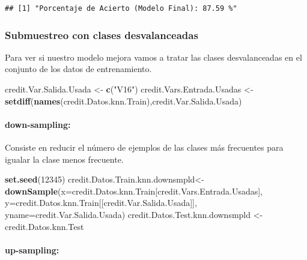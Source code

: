 \documentclass[
]{article}
\newenvironment{Shaded}{\begin{snugshade}}{\end{snugshade}}
\newcommand{\AttributeTok}[1]{\textcolor[rgb]{0.13,0.29,0.53}{#1}}
\newcommand{\DecValTok}[1]{\textcolor[rgb]{0.00,0.00,0.81}{#1}}
\newcommand{\FunctionTok}[1]{\textcolor[rgb]{0.13,0.29,0.53}{\textbf{#1}}}
\newcommand{\NormalTok}[1]{#1}
\newcommand{\OtherTok}[1]{\textcolor[rgb]{0.56,0.35,0.01}{#1}}
\newcommand{\StringTok}[1]{\textcolor[rgb]{0.31,0.60,0.02}{#1}}
\begin{document}
\begin{verbatim}
## [1] "Porcentaje de Acierto (Modelo Final): 87.59 %"
\end{verbatim}

\hypertarget{submuestreo-con-clases-desvalanceadas-1}{%
\subsubsection{Submuestreo con clases
desvalanceadas}\label{submuestreo-con-clases-desvalanceadas-1}}

Para ver si nuestro modelo mejora vamos a tratar las clases
desvalanceadas en el conjunto de los datos de entrenamiento.

\begin{Shaded}
\begin{Highlighting}[]
\NormalTok{credit.Var.Salida.Usada }\OtherTok{\textless{}{-}} \FunctionTok{c}\NormalTok{(}\StringTok{"V16"}\NormalTok{)}
\NormalTok{credit.Vars.Entrada.Usadas }\OtherTok{\textless{}{-}} \FunctionTok{setdiff}\NormalTok{(}\FunctionTok{names}\NormalTok{(credit.Datos.knn.Train),credit.Var.Salida.Usada)}
\end{Highlighting}
\end{Shaded}

\hypertarget{down-sampling-1}{%
\paragraph{down-sampling:}\label{down-sampling-1}}

Consiste en reducir el número de ejemplos de las clases más frecuentes
para igualar la clase menos frecuente.

\begin{Shaded}
\begin{Highlighting}[]
\FunctionTok{set.seed}\NormalTok{(}\DecValTok{12345}\NormalTok{)}
\NormalTok{credit.Datos.Train.knn.downsmpld}\OtherTok{\textless{}{-}}\FunctionTok{downSample}\NormalTok{(}\AttributeTok{x=}\NormalTok{credit.Datos.knn.Train[credit.Vars.Entrada.Usadas],}
                                       \AttributeTok{y=}\NormalTok{credit.Datos.knn.Train[[credit.Var.Salida.Usada]],}
                                       \AttributeTok{yname=}\NormalTok{credit.Var.Salida.Usada)}
\NormalTok{credit.Datos.Test.knn.downsmpld }\OtherTok{\textless{}{-}}\NormalTok{ credit.Datos.knn.Test}
\end{Highlighting}
\end{Shaded}

\hypertarget{up-sampling-1}{%
\paragraph{up-sampling:}\label{up-sampling-1}}
\end{document}
